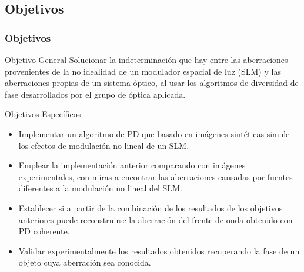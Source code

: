 \documentclass[serif,8pt]{beamer}
\begin{document}
	\subsection{Objetivos}	
		\begin{frame}
		\frametitle{Objetivos}
			\begin{block}{Objetivo General}
			\justifying Solucionar la indeterminación que hay entre las aberraciones provenientes de la no idealidad de un modulador espacial de luz (SLM) y las aberraciones propias de un sistema óptico, al usar los algoritmos de diversidad de fase desarrollados por el grupo de óptica aplicada.
			\end{block}
			
			\begin{block}{Objetivos Específicos}
				\begin{itemize}
				\justifying
				\item Implementar un algoritmo de PD que basado en imágenes sintéticas simule los efectos de modulación no lineal de un SLM. 
				\item Emplear la implementación anterior comparando con imágenes experimentales, con miras a encontrar las aberraciones causadas por fuentes diferentes a la modulación no lineal del SLM.
				\item Establecer si a partir de la combinación de los resultados de los objetivos anteriores puede reconstruirse la aberración del frente de onda obtenido con PD coherente.
				\item Validar experimentalmente los resultados obtenidos recuperando la fase de un objeto cuya aberración sea conocida.
				\end{itemize}
			\end{block}
			\end{frame}

\end{document}
